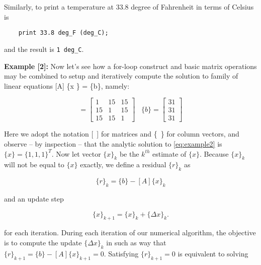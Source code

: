 \noindent
Similarly, to print a temperature at 33.8 degree of Fahrenheit
in terms of Celsius is

\begin{footnotesize}
\begin{verbatim}
    print 33.8 deg_F (deg_C);
\end{verbatim}
\end{footnotesize}

\noindent
and the result is {\tt 1 deg\_C}.

\vspace{0.2 in}
\noindent
{\bf Example [2]:}
Now let's see how a for-loop construct and basic matrix
operations may be combined to setup and iteratively compute the
solution to family of linear equations [A] \{x \} = \{b\}, namely:

\begin{equation}
 [A] = \left [
\begin{array}{rrr}
 1 & 15 & 15 \\
 15 & 1 & 15 \\
 15 & 15 & 1 
\end{array} 
\right] \; \; \;
\{b\} = \left [ 
\begin{array}{r}
 31  \\
 31 \\
 31 
\end{array} 
\right ]
\label{eq:example2}
\end{equation}

\vspace{0.15 in}
\noindent
Here we adopt the notation [~] for matrices and \{~\} for column vectors,
and observe -- by inspection -- that the analytic solution 
to \ref{eq:example2} is $\{x\} = \{1, 1, 1\}^T$.
Now let vector $\{x\}_k$ be the $k^{th}$ estimate of $\{x\}$.
Because $\{x\}_k$ will not be equal to $\{x\}$ exactly,
we define a residual $\{r\}_k$ as

\begin{equation}
\{r\}_k = \{b\}-[A]\{x\}_k 
\label{eq: eq-2}
\end{equation}

\vspace{0.15 in}
\noindent
and an update step

\begin{equation}
\{x\}_{k+1} = \{x\}_k + \{\Delta x\}_k.
\label{eq: eq-3}
\end{equation}

\vspace{0.15 in}
\noindent
for each iteration.
During each iteration of our numerical algorithm,
the objective is to compute the update $\{\Delta x\}_k$ in such
as way that $\{r\}_{k+1} = \{b\} - [A]\{x\}_{k+1}= 0$.
Satisfying $\{r\}_{k+1} = 0$ is equivalent to solving

